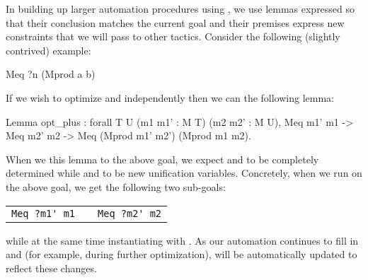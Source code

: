 \documentclass{sigplanconf}
\newcommand{\ltac}[0]{\ensuremath{\mathcal{L}_{\mathrm{tac}}}}
\begin{document}
In building up larger automation procedures using , we use lemmas expressed so that their conclusion matches the current goal and their premises express new constraints that we will pass to other tactics.
Consider the following (slightly contrived) example:
\begin{coq}
Meq ?n (Mprod a b)
\end{coq}
If we wish to optimize  and  independently then we can  the following lemma:
\begin{coq}
Lemma opt_plus : forall {T U} (m1 m1' : M T) (m2 m2' : M U),
  Meq m1' m1 ->
  Meq m2' m2 ->
  Meq (Mprod m1' m2') (Mprod m1 m2).
\end{coq}
When we  this lemma to the above goal, we expect  and  to be completely determined while  and  to be new unification variables.
Concretely, when we run  on the above goal, we get the following two sub-goals:
\begin{center}
\begin{tabular}{ccc}
\lstinline!Meq ?m1' m1! & \qquad & \lstinline!Meq ?m2' m2! \\
\end{tabular}
\end{center}
while at the same time instantiating  with .
As our automation continues to fill in  and  (for example, during further optimization),  will be automatically updated to reflect these changes.  





\end{document}
